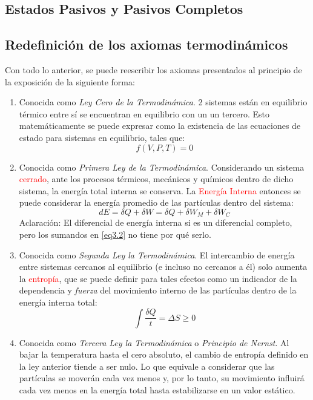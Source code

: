 \documentclass{book}
\begin{document}
\subsection{Estados Pasivos y Pasivos Completos}
\subsection{Redefinición de los axiomas termodinámicos}
Con todo lo anterior, se puede reescribir los axiomas presentados al principio de la exposición de la siguiente forma:
\begin{enumerate}
    \item Conocida como \textit{Ley Cero de la Termodinámica}. 2 sistemas están en equilibrio térmico entre sí se encuentran en equilibrio con un un tercero. Esto matemáticamente se puede expresar como la existencia de las ecuaciones de estado para sistemas en equilibrio, tales que: 
    \begin{equation}\label{eq3.1c}{f(V,P,T)=0}\end{equation}
    \item Conocida como \textit{Primera Ley de la Termodinámica}. Considerando un sistema \textcolor{red}{cerrado}, ante los procesos térmicos, mecánicos y químicos dentro de dicho sistema, la energía total interna se conserva. La \textcolor{red}{Energía Interna} entonces se puede considerar la energía promedio de las partículas dentro del sistema:
    \begin{equation}\label{eq3.2c}{dE=\delta Q+\delta W= \delta Q+ \delta W_M + \delta W_C}\end{equation} Aclaración: El diferencial de energía interna si es un diferencial completo, pero los sumandos en \ref{eq3.2} no tiene por qué serlo. 
    \item Conocida como \textit{Segunda Ley la Termodinámica}. El intercambio de energía entre sistemas cercanos al equilibrio (e incluso no cercanos a él) solo aumenta la \textcolor{red}{entropía}, que se puede definir para tales efectos como un indicador de la dependencia y \textit{fuerza} del movimiento interno de las partículas dentro de la energía interna total:
    \begin{equation}\label{eq3.3c}{\int\frac{\delta Q}{t}=\Delta S \geq 0  }\end{equation}
    \item Conocida como \textit{Tercera Ley la Termodinámica} o \textit{Principio de Nernst}. Al bajar la temperatura hasta el cero absoluto, el cambio de entropía definido en la ley anterior tiende a ser nulo. Lo que equivale a considerar que las partículas se moverán cada vez menos y, por lo tanto, su movimiento influirá cada vez menos en la energía total hasta estabilizarse en un valor estático.

\end{enumerate}
\end{document}
